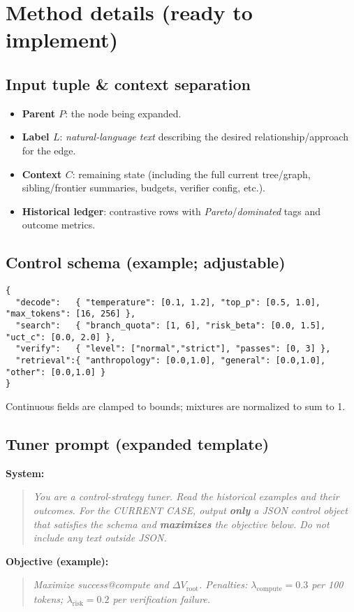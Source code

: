 \documentclass[11pt]{article}
\begin{document}
\section{Method details (ready to implement)}
\subsection{Input tuple \& context separation}
\begin{itemize}[leftmargin=1.2em]
  \item \textbf{Parent $P$}: the node being expanded.
  \item \textbf{Label $L$}: \emph{natural-language text} describing the desired relationship/approach for the edge.
  \item \textbf{Context $C$}: remaining state (including the full current tree/graph, sibling/frontier summaries, budgets, verifier config, etc.).
  \item \textbf{Historical ledger}: contrastive rows with \emph{Pareto}/\emph{dominated} tags and outcome metrics.
\end{itemize}

\subsection{Control schema (example; adjustable)}
\begin{verbatim}
{
  "decode":   { "temperature": [0.1, 1.2], "top_p": [0.5, 1.0], "max_tokens": [16, 256] },
  "search":   { "branch_quota": [1, 6], "risk_beta": [0.0, 1.5], "uct_c": [0.0, 2.0] },
  "verify":   { "level": ["normal","strict"], "passes": [0, 3] },
  "retrieval":{ "anthropology": [0.0,1.0], "general": [0.0,1.0], "other": [0.0,1.0] }
}
\end{verbatim}
Continuous fields are clamped to bounds; mixtures are normalized to sum to 1.

\subsection{Tuner prompt (expanded template)}
\textbf{System:}
\begin{quote}\itshape
You are a control-strategy tuner. Read the historical examples and their outcomes. For the CURRENT CASE, output \textbf{only} a JSON control object that satisfies the schema and \textbf{maximizes} the objective below. Do not include any text outside JSON.
\end{quote}

\noindent\textbf{Objective (example):}
\begin{quote}\itshape
Maximize success@compute and $\Delta V_{\text{root}}$. Penalties: $\lambda_{\text{compute}}=0.3$ per 100 tokens; $\lambda_{\text{risk}}=0.2$ per verification failure.
\end{quote}
\end{document}
